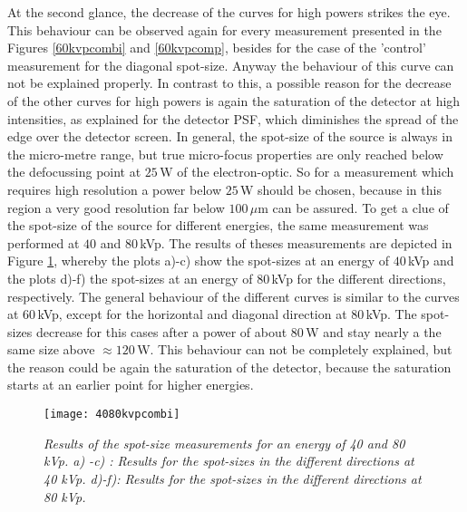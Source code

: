 At the second glance, the decrease of the curves for high powers strikes the eye. This behaviour can be observed again for every measurement presented in the Figures \ref{60kvpcombi} and \ref{60kvpcomp}, besides for the case of the 'control' measurement for the diagonal spot-size. Anyway the behaviour of this curve can not be explained properly. In contrast to this, a possible reason for the decrease of the other curves for high powers is again the saturation of the detector at high intensities, as explained for the detector PSF, which diminishes the spread of the edge over the detector screen. In general, the spot-size of the source is always in the micro-metre range, but true micro-focus properties are only reached below the defocussing point at $25\,$W of the electron-optic. So for a measurement which requires high resolution a power below $25\,$W should be chosen, because in this region a very good resolution far below $100\, \mu$m can be assured. To get a clue of the spot-size of the source for different energies, the same measurement was performed at $40$ and $80\,$kVp. The results of theses measurements are depicted in Figure \ref{4080kvpcombi}, whereby the plots a)-c) show the spot-sizes at an energy of $40\,$kVp and the plots d)-f) the spot-sizes at an energy of $80\,$kVp for the different directions, respectively. The general behaviour of the different curves is  similar to the curves at $60\,$kVp, except for the horizontal and diagonal direction at $80\,$kVp. The spot-sizes decrease for this cases after a power of about $80\,$W and stay nearly a the same size above $\approx 120\,$W. This behaviour can not be completely explained, but the reason could be again the saturation of the detector, because the saturation starts at an earlier point for higher energies.                  	
\begin{figure}
	\begin{center}
		\texttt{[image: 4080kvpcombi]}
	\end{center}
	\caption[Results for the spot-size measurements at an energy of $40$ and $80\,$kVp]{\textit{Results of the spot-size measurements for an energy of 40 and 80 kVp. a) -c) : Results for the spot-sizes in the different directions at 40 kVp. d)-f): Results for the spot-sizes in the different directions at 80 kVp. }}
	\label{4080kvpcombi}
\end{figure}
\clearpage
